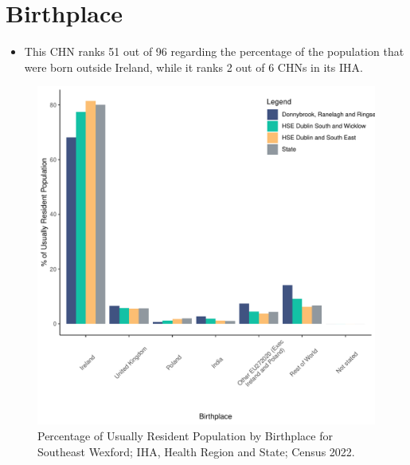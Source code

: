 \documentclass{article}
\begin{document}
\section{Birthplace}\label{sect:Birth}
\begin{itemize}
\item This CHN ranks  51 out of 96 regarding the percentage of the population that were born outside Ireland, while it ranks  2 out of 6 CHNs in its IHA.
\end{itemize}
\begin{figure}[H]
	\centering
	\includegraphics[width = 130mm]{../figures/BirthED.pdf}
	\caption{Percentage of Usually Resident Population by Birthplace for Southeast Wexford; IHA, Health Region and State; Census 2022.}
	\label{fig:vbnv}
	\end{figure}
	
\end{document}
